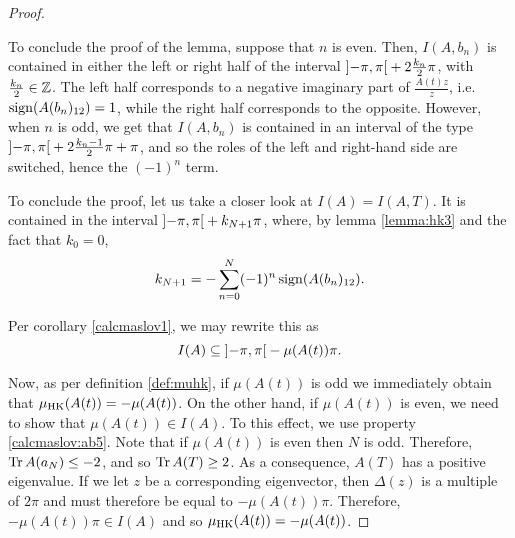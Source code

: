 \begin{proof}
\begin{lemmaproof}
To conclude the proof of the lemma, suppose that $n$ is even. Then, $I(A,b_n)$ is contained in either the left or right half of the interval $\ointerval{-\pi}\pi + 2 \frac{k_n}2 \pi$, with $\frac{k_n}2 \in \mathbb{Z}$. The left half corresponds to a negative imaginary part of $\frac{A(t) z}z$, i.e. $\operatorname{sign}(A(b_n)_{12}) = 1$, while the right half corresponds to the opposite. However, when $n$ is odd, we get that $I(A,b_n)$ is contained in an interval of the type $\ointerval{-\pi}\pi + 2 \frac{k_n - 1}2 \pi + \pi$, and so the roles of the left and right-hand side are switched, hence the $(-1)^n$ term.
\end{lemmaproof}

To conclude the proof, let us take a closer look at $I(A) = I(A,T)$. It is contained in the interval $\ointerval{-\pi}\pi + k_{N+1} \pi$, where, by lemma \ref{lemma:hk3} and the fact that $k_0 = 0$,
\begin{equation}
k_{N+1} = - \sum_{n = 0}^N (-1)^n \operatorname{sign}(A(b_n)_{12}).
\end{equation}

Per corollary \ref{calcmaslov1}, we may rewrite this as
\begin{equation}
I(A) \subseteq \ointerval{-\pi}\pi - \mu(A(t)) \pi.
\end{equation}

Now, as per definition \ref{def:muhk}, if $\mu(A(t))$ is odd we immediately obtain that $\mu_{\mathrm{HK}}(A(t)) = -\mu(A(t))$. On the other hand, if $\mu(A(t))$ is even, we need to show that $\mu(A(t)) \in I(A)$. To this effect, we use property \ref{calcmaslov:ab5}. Note that if $\mu(A(t))$ is even then $N$ is odd. Therefore, $\operatorname{Tr} A(a_N) \leq -2$, and so $\operatorname{Tr} A(T) \geq 2$. As a consequence, $A(T)$ has a positive eigenvalue. If we let $z$ be a corresponding eigenvector, then $\Delta(z)$ is a multiple of $2\pi$ and must therefore be equal to $-\mu(A(t)) \pi$. Therefore, $-\mu(A(t)) \pi \in I(A)$ and so $\mu_{\mathrm{HK}}(A(t)) = -\mu(A(t))$.
\end{proof}